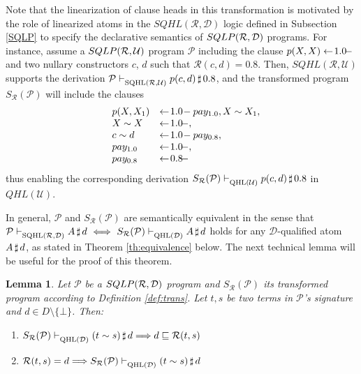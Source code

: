 \documentclass{sigplanconf}
\newcommand{\qdom}{\mathcal{D}} \newcommand{\dqdom}{D \setminus \{\bot\}} \newcommand{\bqdom}{(D \setminus \{\bot\}) \uplus \{?\}}
\newcommand{\U}{\mathcal{U}}
\newcommand{\simrel}{\mathcal{R}}
\newcommand{\trans}[2]{S_{#1}(#2)}
\newcommand{\Prog}{\mathcal{P}} \newcommand{\UProg}{\mathcal{P_U}}
\theoremstyle{definition}
\theoremstyle{plain}
\newtheorem{lemma}{Lemma}
\begin{document}
Note that the linearization of clause heads in this transformation is motivated by the role of linearized atoms in the $SQHL(\simrel,\qdom)$ logic defined in Subsection \ref{SQLP} to specify the declarative semantics of $\sqlp{\simrel}{\qdom}$ programs. For instance, assume  a $\sqlp{\simrel}{\U}$ program $\Prog$ including the clause $p(X,X) \gets\!1.0\!-$ and two nullary constructors $c$, $d$ such that $\simrel(c,d) = 0.8$. Then, $SQHL(\simrel,\U)$ supports the derivation $\Prog \sqhlx{\simrel}{\U}{} \at{p(c,d)}{0.8}$, and the transformed program $\trans{\simrel}{\Prog}$ will include the clauses
$$
\begin{array}{lll}
            & p(X, X_1) & \qgets{1.0} pay_{1.0}, X \sim X_1,\\
                            & X \sim X     & \qgets{1.0},\\
                            & c \sim d     & \qgets{1.0} pay_{0.8},\\
                            & pay_{1.0}    & \qgets{1.0}, \\
                            & pay_{0.8}    & \qgets{0.8}
\end{array}
$$
thus enabling the corresponding derivation $\trans{\simrel}{\Prog} \qhlx{\U}{} \at{p(c,d)}{0.8}$ in $QHL(\U)$.



In general, $\Prog$ and $\trans{\simrel}{\Prog}$ are semantically equivalent in the sense that  $\Prog \sqhlrd \at{A}{d}\ \Longleftrightarrow\ \trans{\simrel}{\Prog} \qhld \at{A}{d}$ holds for any $\qdom$-qualified atom $A\,\sharp\,d$, as stated in Theorem \ref{th:equivalence} below. The next technical lemma will be useful for the proof of this theorem.

\begin{lemma} \label{lema:equiv}
Let $\mathcal{P}$ be a $\sqlp{\simrel}{\qdom}$ program and $\trans{\simrel}{\Prog}$ its transformed program according to Definition \ref{def:trans}. Let $t,s$ be two terms in $\Prog$'s signature and $d \in \dqdom$. Then:
\begin{enumerate}
    \item \label{lema:equiv:1} $\trans{\simrel}{\Prog} \qhld \at{(t \sim s)}{d} \Longrightarrow d \sqsubseteq  \simrel(t,s)$
    \item \label{lema:equiv:2} $\simrel(t,s) = d \Longrightarrow \trans{\simrel}{\Prog} \qhld \at{(t \sim s)}{d}$
\end{enumerate}
\end{lemma}
\end{document}
